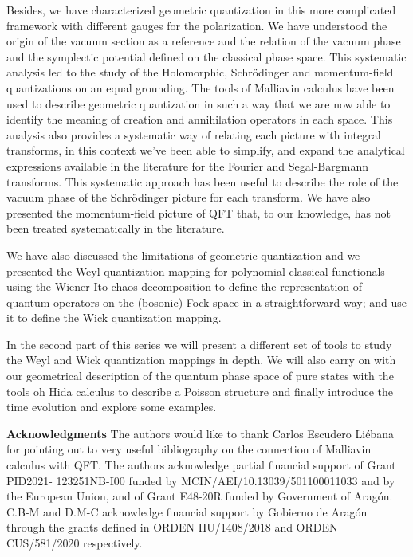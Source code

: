 \documentclass[12pt]{article}%
\begin{document}
Besides, we have characterized geometric quantization in this more complicated framework with different gauges for the polarization.  We have understood  the origin of the vacuum section as a reference and the relation of the vacuum phase and the symplectic potential defined on the classical phase space.  This systematic analysis led to the study of the Holomorphic, Schrödinger and momentum-field quantizations on an equal grounding. The tools of Malliavin calculus have been used to describe geometric quantization in such a way that we are now able to identify the meaning of  creation and annihilation operators in each space. This analysis also provides a systematic way of relating each picture with integral transforms, in this context we've been able to simplify, and expand the analytical expressions available in the literature for the Fourier and Segal-Bargmann transforms. This systematic approach has been useful to describe the role of the vacuum phase of the Schrödinger picture for each transform. We have also presented the momentum-field picture of QFT that, to our knowledge, has not been treated systematically in the literature.      

 We have also discussed the limitations of geometric quantization and we presented the Weyl quantization mapping for polynomial classical functionals using the Wiener-Ito chaos decomposition to define the representation of quantum operators on the (bosonic) Fock space in a straightforward way; and use it to define the Wick quantization mapping. 

 In the second part of this series we will present a different set of tools to study the Weyl and Wick quantization mappings in depth. We will also carry on with our geometrical description of the quantum phase space of pure states with the tools oh Hida calculus to describe a Poisson structure and finally introduce the time evolution and explore some examples.   



\textbf{Acknowledgments}
The authors would like to thank  Carlos Escudero Liébana for pointing out to very useful bibliography on the connection of Malliavin calculus with QFT.
The authors acknowledge partial financial support of Grant PID2021-
123251NB-I00 funded by MCIN/AEI/10.13039/501100011033 and by the
European Union, and of Grant E48-20R funded by Government of Aragón.
C.B-M and D.M-C acknowledge financial support by Gobierno de Aragón
through the grants defined in ORDEN IIU/1408/2018 and ORDEN
CUS/581/2020 respectively.
\end{document}
